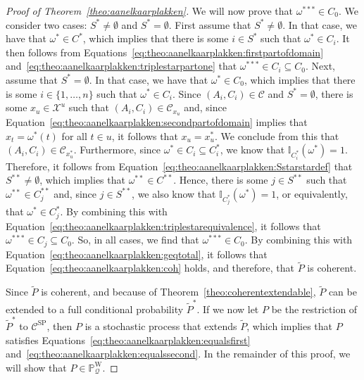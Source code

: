 \documentclass[10pt]{paper}
\theoremstyle{definition}
\newcommand{\states}{\mathcal{X}}
\newcommand{\processes}{\mathbb{P}}
\newcommand{\wprocesses}{\processes^{\mathrm{W}}}
\newcommand{\ind}[1]{\mathbb{I}_{#1}}
\newcommand{\rateset}{\mathcal{Q}}
\begin{document}
\begin{proof}[Proof of Theorem~\ref{theo:aanelkaarplakken}]
We will now prove that $\omega^{***}\in C_0$. We consider two cases: $S^*\neq\emptyset$ and $S^*=\emptyset$. First assume that $S^*\neq\emptyset$. In that case, we have that $\omega^*\in C^*$, which implies that there is some $i\in S^*$ such that $\omega^*\in C_i$. It then follows from Equations~\eqref{eq:theo:aanelkaarplakken:firstpartofdomain} and~\eqref{eq:theo:aanelkaarplakken:triplestarpartone} that $\omega^{***}\in C_i\subseteq C_0$. 
Next, assume that $S^*=\emptyset$. In that case, we have that $\omega^*\in C_0$, which implies that there is some $i\in\{1,\dots,n\}$ such that $\omega^*\in C_i$. Since $(A_i,C_i)\in\mathcal{C}$ and $S^*=\emptyset$, there is some $x_u\in\states^u$ such that $(A_i,C_i)\in\mathcal{C}_{x_u}$ and, since Equation~\eqref{eq:theo:aanelkaarplakken:secondpartofdomain} implies that $x_t=\omega^*(t)$ for all $t\in u$, it follows that $x_u=x_u^*$. We conclude from this that $(A_i,C_i)\in\mathcal{C}_{x_u^*}$. Furthermore, since $\omega^*\in C_i\subseteq C_i^*$, we know that $\ind{C_i^*}(\omega^*)=1$. Therefore, it follows from Equation~\eqref{eq:theo:aanelkaarplakken:Sstarstardef} that $S^{**}\neq\emptyset$, which implies that $\omega^{**}\in C^{**}$. Hence, there is some $j\in S^{**}$ such that $\omega^{**}\in C_j^{**}$ and, since $j\in S^{**}$, we also know that $\ind{C_j^*}(\omega^*)=1$, or equivalently, that $\omega^*\in C_j^*$. By combining this with Equation~\eqref{eq:theo:aanelkaarplakken:triplestarequivalence}, it follows that $\omega^{***}\in C_j\subseteq C_0$.
So, in all cases, we find that $\omega^{***}\in C_0$. By combining this with Equation~\eqref{eq:theo:aanelkaarplakken:geqtotal}, it follows that Equation~\eqref{eq:theo:aanelkaarplakken:coh} holds, and therefore, that $\tilde{P}$ is coherent.


Since $\tilde{P}$ is coherent, and because of Theorem~\ref{theo:coherentextendable}, $\tilde{P}$ can be extended to a full conditional probability $\tilde{P}^*$. If we now let $P$ be the restriction of $\tilde{P}^*$ to $\mathcal{C}^\mathrm{SP}$, then $P$ is a stochastic process that extends $\tilde{P}$, which implies that $P$ satisfies Equations~\eqref{eq:theo:aanelkaarplakken:equalsfirst} and~\eqref{eq:theo:aanelkaarplakken:equalssecond}. In the remainder of this proof, we will show that $P\in\wprocesses_\rateset$.


\end{proof}
\end{document}
